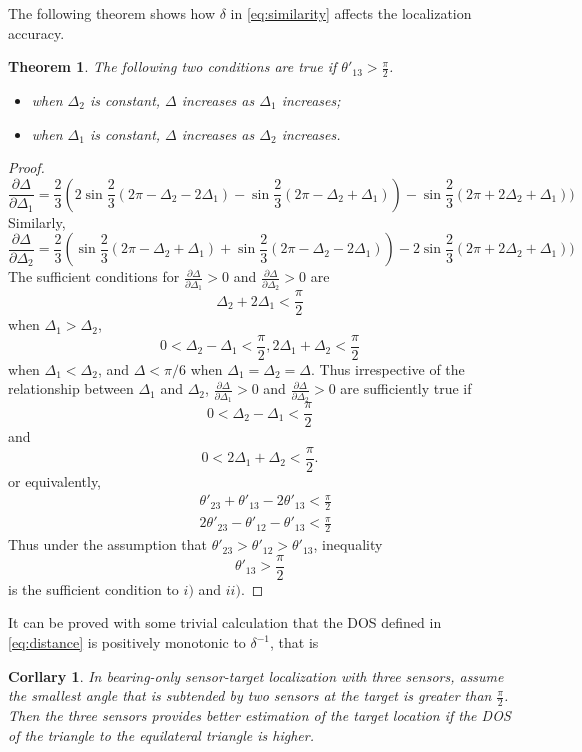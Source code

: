\documentclass[times]{rncauth}
\newtheorem{thm}{Theorem}[section]
\newtheorem{cor}{Corllary}[section]
\begin{document}
The following theorem shows how $\delta$ in \eqref{eq:similarity}
affects the localization accuracy.
\begin{thm}\label{thm:estimation_opt}
The following two conditions are true if
$\theta'_{13}>\frac{\pi}{2}$.
\begin{itemize}
\item[i).] when $\Delta_2$ is constant, $\Delta$
increases as $\Delta_1$ increases;
\item[ii).] when $\Delta_1$ is constant, $\Delta$ increases as
$\Delta_2$ increases.
\end{itemize}

\end{thm}
\begin{proof}
\begin{equation}
\frac{\partial \Delta}{\partial \Delta_1}=\frac{2}{3}(2\sin
\frac{2}{3}(2\pi-\Delta_2-2\Delta_1)-\sin\frac{2}{3}(2\pi-\Delta_2+\Delta_1))-\sin\frac{2}{3}(2\pi+2\Delta_2+\Delta_1))
\end{equation}
Similarly,
\begin{equation}
\frac{\partial \Delta}{\partial \Delta_2}=\frac{2}{3}(\sin
\frac{2}{3}(2\pi-\Delta_2+\Delta_1)+\sin\frac{2}{3}(2\pi-\Delta_2-2\Delta_1))-2\sin\frac{2}{3}(2\pi+2\Delta_2+\Delta_1))
\end{equation}
The sufficient conditions  for $\frac{\partial \Delta}{\partial
\Delta_1}>0$ and $\frac{\partial \Delta}{\partial \Delta_2}>0$ are
\begin{equation}\label{eq:temp4}\Delta_2+2\Delta_1< \frac{\pi}{2}\end{equation} when
$\Delta_1>\Delta_2$,
\begin{equation}\label{eq:temp5}0<\Delta_2-\Delta_1<\frac{\pi}{2},
2\Delta_1+\Delta_2<\frac{\pi}{2}\end{equation} when
$\Delta_1<\Delta_2$, and $\Delta<\pi/6$ when
$\Delta_1=\Delta_2=\Delta$. Thus irrespective of the relationship
between $\Delta_1$ and $\Delta_2$, $\frac{\partial \Delta}{\partial
\Delta_1}>0$ and $\frac{\partial \Delta}{\partial \Delta_2}>0$ are
sufficiently true if
$$0<\Delta_2-\Delta_1<\frac{\pi}{2}$$
and
$$0<2\Delta_1+\Delta_2<\frac{\pi}{2}.$$
or equivalently,
\begin{align}
  &\theta'_{23}+\theta'_{13}-2\theta'_{13}<\frac{\pi}{2}\nonumber\\
  &2\theta'_{23}-\theta'_{12}-\theta'_{13}<\frac{\pi}{2}
\end{align}
Thus under the assumption that
$\theta'_{23}>\theta'_{12}>\theta'_{13}$, inequality
$$\theta'_{13}>\frac{\pi}{2}$$
is the sufficient condition to $i)$ and $ii)$.
\end{proof}
It can be proved with some trivial calculation that the DOS
defined in \eqref{eq:distance} is positively monotonic to $\delta^{-1}$,
that is
\begin{cor}\label{cor:similarity}
  In bearing-only sensor-target localization with three sensors, assume the smallest angle that is
  subtended by two sensors
  at the target is greater than $\frac{\pi}{2}$.  Then the three
  sensors provides better estimation of the target location if the DOS of the triangle to the
   equilateral triangle is higher.
\end{cor}
\end{document}
